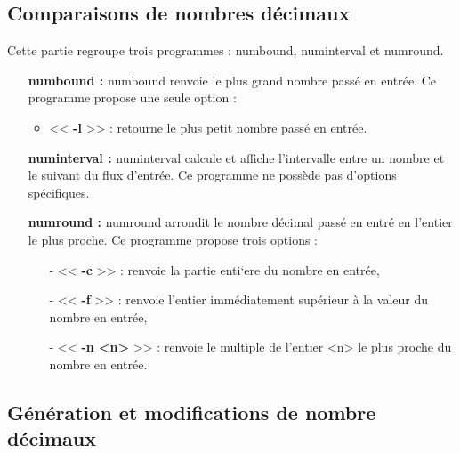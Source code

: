\subsection{Comparaisons de nombres d\'ecimaux}

Cette partie regroupe trois programmes : numbound, numinterval et numround.
\newline
\begin{itemize}
 \item[\textbullet]  \textbf{numbound :} numbound renvoie le plus grand nombre pass\'e en entr\'ee.
Ce programme propose une seule option :
\begin{itemize}
  \item << \textbf{-l} >> : retourne le plus petit nombre pass\'e en entr\'ee.
\newline
\end{itemize}
 \item[\textbullet] \textbf{numinterval :} numinterval calcule et affiche l'intervalle entre un nombre et le suivant du flux d'entr\'ee.
Ce programme ne poss\`ede pas d'options sp\'ecifiques.
\newline
 \item[\textbullet] \textbf{numround :} numround arrondit le nombre d\'ecimal pass\'e en entr\'e en l'entier le plus proche.
Ce programme propose trois options :
\begin{itemize}
 \item[-] << \textbf{-c} >> : renvoie la partie enti`ere du nombre en entr\'ee,
 \item[-] << \textbf{-f} >> : renvoie l'entier immédiatement supérieur à la valeur du nombre en entr\'ee, 
 \item[-] << \textbf{-n <n>} >> : renvoie le multiple de l'entier <n> le plus proche du nombre en entr\'ee.
\end{itemize}
\end{itemize}

\subsection{G\'en\'eration et modifications de nombre d\'ecimaux}

